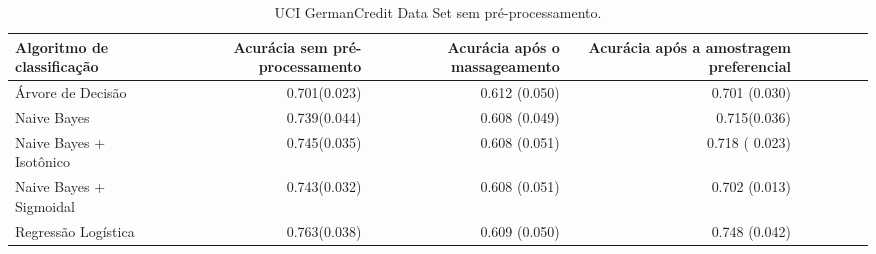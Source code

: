 \begin{table}
    \centering
    \caption{UCI GermanCredit Data Set sem pré-processamento.}
    \label{table:germanscoresSemPP}
    \begin{tabular}{lrrrrrrrl}
    \toprule
    Algoritmo de classificação  & Acurácia sem pré-processamento &  Acurácia após o massageamento & Acurácia após a amostragem preferencial  \\
        \midrule
        Árvore de Decisão       & 0.701(0.023)      &   0.612 (0.050)   &   0.701 (0.030) \\
        Naive Bayes             &   0.739(0.044)    &   0.608 (0.049)   &   0.715(0.036) \\
        Naive Bayes + Isotônico &  0.745(0.035)     &   0.608 (0.051)   &   0.718 ( 0.023)\\
        Naive Bayes + Sigmoidal & 0.743(0.032)      &   0.608 (0.051)   &    0.702 (0.013)\\
        Regressão Logística     & 0.763(0.038)      &   0.609 (0.050)   &  0.748 (0.042)\\
    \bottomrule
    \end{tabular}
    \end{table}